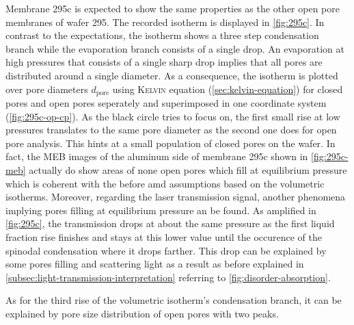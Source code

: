 \documentclass[thesis.tex]{subfiles}
\begin{document}
          Membrane 295c is expected to show the same properties as the other open pore membranes of wafer 295. The recorded isotherm is displayed in \cref{fig:295c}. In contrast to the expectations, the isotherm shows a three step condensation branch while the evaporation branch consists of a single drop. An evaporation at high pressures that consists of a single sharp drop implies that all pores are distributed around a single diameter. As a consequence, the isotherm is plotted over pore diameters $d_\mathrm{pore}$ using \textsc{Kelvin} equation (\cref{sec:kelvin-equation}) for closed pores and open pores seperately and superimposed in one coordinate system (\cref{fig:295c-op-cp}). As the black circle tries to focus on, the first small rise at low pressures translates to the same pore diameter as the second one does for open pore analysis. This hints at a small population of closed pores on the wafer. In fact, the MEB images of the aluminum side of membrane 295c shown in \cref{fig:295c-meb} actually do show areas of none open pores which fill at equilibrium pressure which is coherent with the before amd assumptions based on the volumetric isotherms. Moreover, regarding the laser transmission signal, another phenomena implying pores filling at equilibrium pressure an be found. As amplified in \cref{fig:295c}, the transmission drops at about the same pressure as the first liquid fraction rise finishes and stays at this lower value until the occurence of the spinodal condensation where it drops farther. This drop can be explained by some pores filling and scattering light as a result as before explained in \cref{subsec:light-transmission-interpretation} referring to \cref{fig:disorder-absorption}.

          As for the third rise of the volumetric isotherm's condensation branch, it can be explained by pore size distribution of open pores with two peaks. 

          
\end{document}
